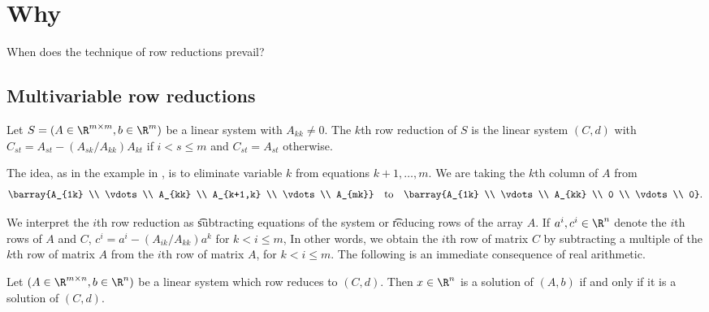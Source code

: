 

\section*{Why}

When does the technique of row reductions prevail?

\subsection*{Multivariable row reductions}

Let $S = (A \in \R ^{m \times m}, b \in \R ^{m})$ be a linear system with $A_{kk} \neq 0$.
The \t{$k$th row reduction} of $S$ is the linear system $(C, d)$ with $C_{st} = A_{st} - (A_{sk}/A_{kk})A_{kt}$ if $i < s \leq m$ and $C_{st} = A_{st}$ otherwise.

The idea, as in the example in , is to eliminate variable $k$ from equations $k+1, \dots , m$.
We are taking the $k$th column of $A$ from
    \[
\barray{A_{1k} \\ \vdots \\ A_{kk} \\ A_{k+1,k} \\ \vdots \\ A_{mk}} \quad \text{to} \quad \barray{A_{1k} \\ \vdots \\ A_{kk} \\ 0 \\ \vdots \\ 0}.
    \]

We interpret the $i$th row reduction as \t{subtracting equations} of the system or \t{reducing rows} of the array $A$.
If $a^i, c^i \in \R ^{n}$ denote the $i$th rows of $A$ and $C$, $c^i = a^i - (A_{ik}/A_{kk})a^k$ for $k < i \leq m$,
In other words, we obtain the $i$th row of matrix $C$ by subtracting a multiple of the $k$th row of matrix $A$ from the $i$th row of matrix $A$, for $k < i \leq m$.
The following is an immediate consequence of real arithmetic.

\begin{proposition}

\label{proposition:ordinaryrowreductions:basic}Let $(A \in \R ^{m \times  n}, b \in \R ^{n})$ be a linear system which row reduces to $(C, d)$.
Then $x \in \R ^{n}$ is a solution of $(A, b)$ if and only if it is a solution of $(C, d)$.\end{proposition}
